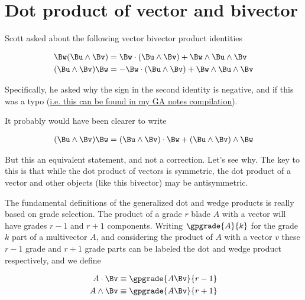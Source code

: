 

\chapter{Dot product of vector and bivector}
\label{chap:dotBlade}
{}
\date{Aug 11, 2009}

\beginArtNoToc

Scott asked about the following vector bivector product identities

\begin{align}
\Bw (\Bu \wedge \Bv) &= \Bw \cdot (\Bu \wedge \Bv) + \Bw \wedge \Bu \wedge \Bv \\
(\Bu \wedge \Bv) \Bw &= - \Bw \cdot (\Bu \wedge \Bv) + \Bw \wedge \Bu \wedge \Bv
\end{align}

Specifically, he asked why the sign in the second identity is negative, and if this was a typo (\href{http://sites.google.com/site/peeterjoot/math2009/gabook.pdf}{i.e. this can be found in my GA notes compilation}).

It probably would have been clearer to write

\begin{align*}
(\Bu \wedge \Bv) \Bw = (\Bu \wedge \Bv) \cdot \Bw + (\Bu \wedge \Bv) \wedge \Bw
\end{align*}

But this an equivalent statement, and not a correction.  Let's see why.  The key to this is that while the dot product of vectors is symmetric, the dot product of a vector and other objects (like this bivector) may be antisymmetric.

The fundamental definitions of the generalized dot and wedge products is really based on grade selection.  The product of a grade $r$ blade $A$ with a vector will have grades $r-1$ and $r+1$ components.  Writing $\gpgrade{A}{k}$ for the grade $k$ part of a multivector $A$, and considering the product of $A$ with a vector $v$ these $r-1$ grade and $r+1$ grade parts can be labeled the dot and wedge product respectively, and we define

\begin{align}\label{eqn:dotWedgeDefined}
A \cdot \Bv &\equiv \gpgrade{A \Bv}{r-1} \\
A \wedge \Bv &\equiv \gpgrade{A \Bv}{r+1} 
\end{align}

